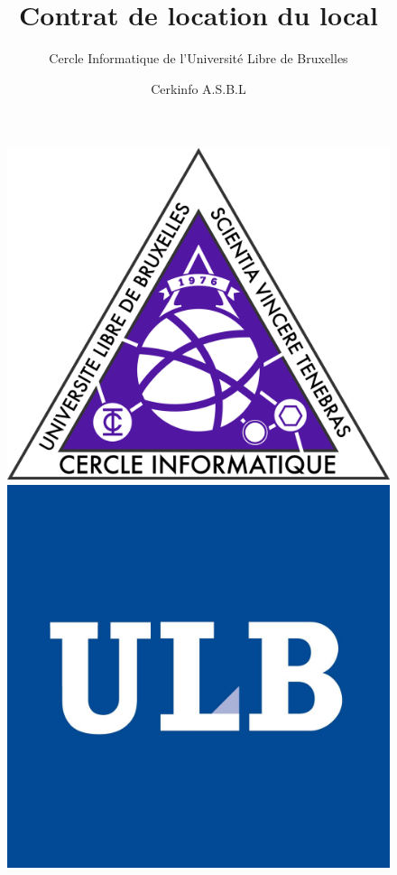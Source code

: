 \documentclass{article}
\title{Contrat de location du local}
\author{Cercle Informatique de l'Université Libre de Bruxelles}
\date{Cerkinfo A.S.B.L}
\begin{document}
\begin{figure}
	\includegraphics[scale=0.03]{ci.png}
	\hfill
	\includegraphics[scale=0.4]{ulb.png}
  \label{fig:ci}
\end{figure}

\maketitle
\end{document}
